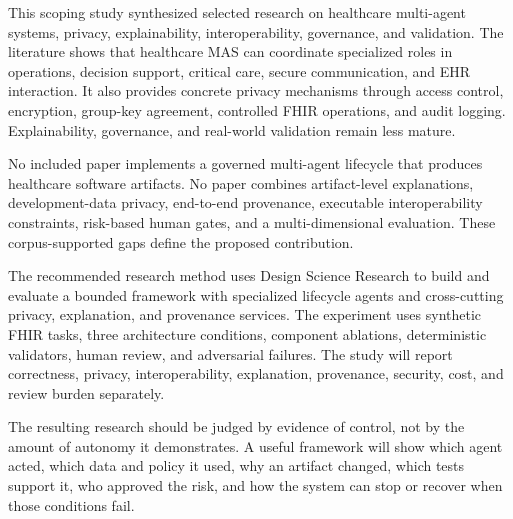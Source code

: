 \documentclass[11pt,a4paper]{article}
\begin{document}
This scoping study synthesized selected research on healthcare multi-agent systems, privacy, explainability, interoperability, governance, and validation. The literature shows that healthcare MAS can coordinate specialized roles in operations, decision support, critical care, secure communication, and EHR interaction. It also provides concrete privacy mechanisms through access control, encryption, group-key agreement, controlled FHIR operations, and audit logging. Explainability, governance, and real-world validation remain less mature.

No included paper implements a governed multi-agent lifecycle that produces healthcare software artifacts. No paper combines artifact-level explanations, development-data privacy, end-to-end provenance, executable interoperability constraints, risk-based human gates, and a multi-dimensional evaluation. These corpus-supported gaps define the proposed contribution.

The recommended research method uses Design Science Research to build and evaluate a bounded framework with specialized lifecycle agents and cross-cutting privacy, explanation, and provenance services. The experiment uses synthetic FHIR tasks, three architecture conditions, component ablations, deterministic validators, human review, and adversarial failures. The study will report correctness, privacy, interoperability, explanation, provenance, security, cost, and review burden separately.

The resulting research should be judged by evidence of control, not by the amount of autonomy it demonstrates. A useful framework will show which agent acted, which data and policy it used, why an artifact changed, which tests support it, who approved the risk, and how the system can stop or recover when those conditions fail.

\clearpage


\end{document}
